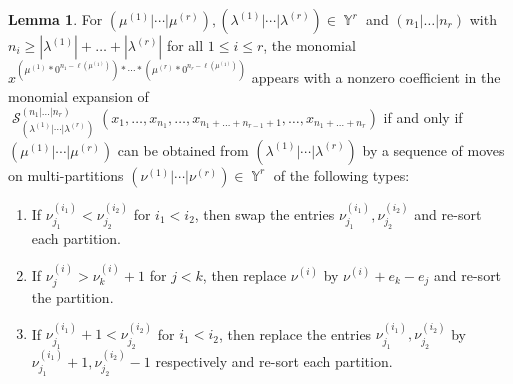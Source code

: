 \documentclass[12pt,reqno]{amsart}
\theoremstyle{definition}
\newtheorem{lem}[thm]{Lemma}
\DeclareMathOperator{\Par}{\mathbb{Y}}
\DeclareMathOperator{\cS}{\mathcal{S}}
\begin{document}
\begin{lem}\label{Moves lemma}
    For $(\mu^{(1)}|\cdots |\mu^{(r)}),(\lambda^{(1)}|\cdots | \lambda^{(r)}) \in \Par^r$ and $(n_1|\ldots|n_r)$ with $n_i \geq |\lambda^{(1)}| + \ldots + |\lambda^{(r)}|$ for all $1\leq i \leq r$, the monomial $x^{(\mu^{(1)}*0^{n_1- \ell(\mu^{(1)})})*\cdots *(\mu^{(r)}*0^{n_r- \ell(\mu^{(1)})})}$ appears with a nonzero coefficient in the monomial expansion of $\cS_{(\lambda^{(1)}|\cdots | \lambda^{(r)})}^{(n_1|\ldots|n_r)}(x_1,\ldots,x_{n_1},\ldots,x_{n_1+\ldots +n_{r-1}+1},\ldots,x_{n_1+\ldots+n_{r}})$ if and only if $(\mu^{(1)}|\cdots |\mu^{(r)})$ can be obtained from $(\lambda^{(1)}|\cdots | \lambda^{(r)})$ by a sequence of moves on multi-partitions $(\nu^{(1)}|\cdots|\nu^{(r)}) \in \Par^r$ of the following types:
    \begin{enumerate}
        \item[\textbf{Move 1}:] \label{Moves} If $\nu^{(i_1)}_{j_1}< \nu^{(i_2)}_{j_2}$ for $i_1< i_2$, then swap the entries $\nu^{(i_1)}_{j_1},\nu^{(i_2)}_{j_2}$ and re-sort each partition.
        \item[\textbf{Move 2}:]  If $\nu^{(i)}_{j} > \nu^{(i)}_{k}+1$ for $j< k$, then replace $\nu^{(i)}$ by $\nu^{(i)}+e_{k}-e_j$ and re-sort the partition.
        \item[\textbf{Move 3}:]  If $\nu_{j_1}^{(i_1)} +1 < \nu^{(i_2)}_{j_2}$ for $i_1 < i_2$, then replace the entries $\nu_{j_1}^{(i_1)},\nu^{(i_2)}_{j_2}$ by $\nu_{j_1}^{(i_1)}+1,\nu^{(i_2)}_{j_2}-1$ respectively and re-sort each partition. 
    \end{enumerate}
\end{lem}
\end{document}
